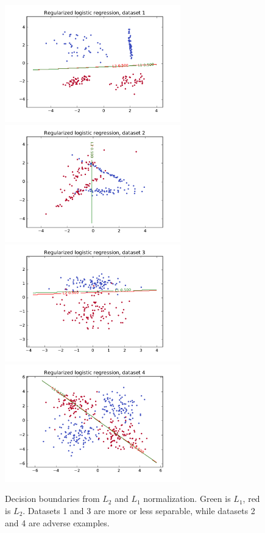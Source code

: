 \documentclass{article}
\begin{document}
\begin{multicols}{2}
\begin{figure}
   \centering
   \includegraphics[width=3in]{img/1-3-1.pdf}
   \includegraphics[width=3in]{img/1-3-2.pdf}
   \includegraphics[width=3in]{img/1-3-3.pdf}
   \includegraphics[width=3in]{img/1-3-4.pdf}
   \caption{Decision boundaries from $L_2$ and $L_1$ normalization. Green is $L_1$, red is $L_2$. Datasets 1 and 3 are more or less separable, while datasets 2 and 4 are adverse examples.}
   \label{fig:1-3-boundaries}
\end{figure}


\end{multicols}
\end{document}
